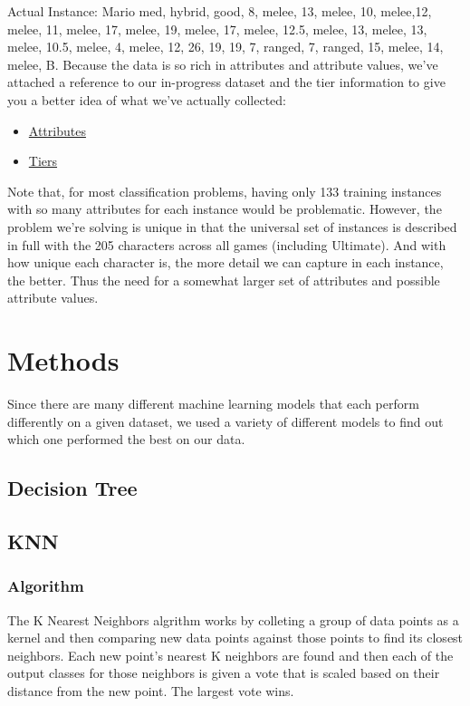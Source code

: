 \documentclass{article}
\begin{document}
Actual Instance: Mario
med, hybrid, good, 8, melee, 13, melee, 10, melee,12, melee, 11, melee, 17, melee, 19, melee, 17, melee, 12.5, melee, 13, melee, 13, melee, 10.5, melee,  4,  melee, 12, 26, 19, 19, 7, ranged, 7, ranged, 15, melee, 14, melee, B.
Because the data is so rich in attributes and attribute values, we’ve attached a reference to our in-progress dataset  and the tier information to give you a better idea of what we’ve actually collected:
\begin{itemize}
  \item\href{https://docs.google.com/spreadsheets/d/103elr0mhpr14yhiLLib4\_KinrFvMXrBGhfcc1fdAJjE/edit?usp=sharing}{Attributes}
  \item\href{https://docs.google.com/spreadsheets/d/18\_zleVDd54rsXNylzEztfFuTKHLIQ6wrmeXgQ1AGhSc/edit?usp=sharing}{Tiers}
\end{itemize}

Note that, for most classification problems, having only 133 training instances with so many attributes for each instance would be problematic. However, the problem we’re solving is unique in that the universal set of instances is described in full with the 205 characters across all games (including Ultimate). And with how unique each character is, the more detail we can capture in each instance, the better. Thus the need for a somewhat larger set of attributes and possible attribute values.

\section{Methods}

Since there are many different machine learning models that each perform differently on a given dataset, we used a variety of different models to find out which one performed the best on our data.

\subsection{Decision Tree}
\subsection{KNN}
\subsubsection{Algorithm}
The K Nearest Neighbors algrithm works by colleting a group of data points as a kernel and then comparing new data points against those points to find its closest neighbors. Each new point's nearest K neighbors are found and then each of the output classes for those neighbors is given a vote that is scaled based on their distance from the new point. The largest vote wins.
\end{document}
